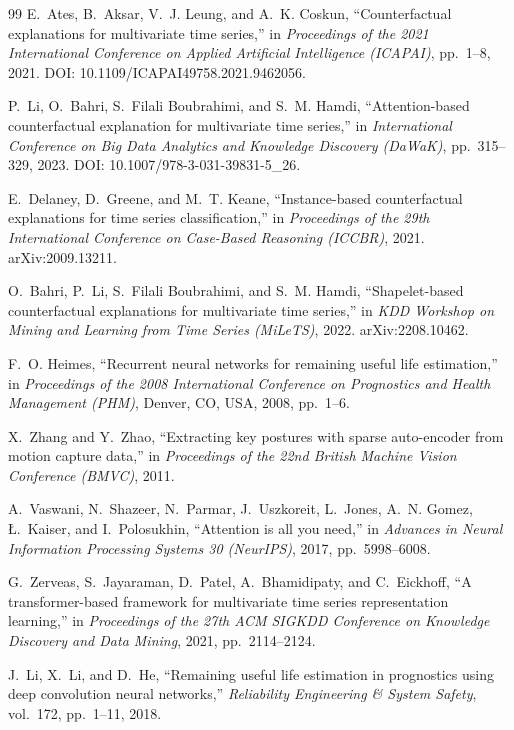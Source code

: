 \begin{thebibliography}{99}
E.~Ates, B.~Aksar, V.~J. Leung, and A.~K. Coskun,
``Counterfactual explanations for multivariate time series,''
in \textit{Proceedings of the 2021 International Conference on Applied Artificial Intelligence (ICAPAI)},
pp.~1--8, 2021.
DOI: 10.1109/ICAPAI49758.2021.9462056.

P.~Li, O.~Bahri, S.~Filali Boubrahimi, and S.~M. Hamdi,
``Attention-based counterfactual explanation for multivariate time series,''
in \textit{International Conference on Big Data Analytics and Knowledge Discovery (DaWaK)},
pp.~315--329, 2023.
DOI: 10.1007/978-3-031-39831-5\_26.

E.~Delaney, D.~Greene, and M.~T. Keane,
``Instance-based counterfactual explanations for time series classification,''
in \textit{Proceedings of the 29th International Conference on Case-Based Reasoning (ICCBR)},
2021. arXiv:2009.13211.

O.~Bahri, P.~Li, S.~Filali Boubrahimi, and S.~M. Hamdi,
``Shapelet-based counterfactual explanations for multivariate time series,''
in \textit{KDD Workshop on Mining and Learning from Time Series (MiLeTS)},
2022. arXiv:2208.10462.

F.~O. Heimes,
``Recurrent neural networks for remaining useful life estimation,''
in \textit{Proceedings of the 2008 International Conference on Prognostics and Health Management (PHM)},
Denver, CO, USA, 2008, pp.~1--6.

X.~Zhang and Y.~Zhao,
``Extracting key postures with sparse auto-encoder from motion capture data,''
in \textit{Proceedings of the 22nd British Machine Vision Conference (BMVC)}, 2011.

A.~Vaswani, N.~Shazeer, N.~Parmar, J.~Uszkoreit, L.~Jones, A.~N. Gomez, {\L}.~Kaiser, and I.~Polosukhin,
``Attention is all you need,''
in \textit{Advances in Neural Information Processing Systems 30 (NeurIPS)}, 2017, pp.~5998--6008.

G.~Zerveas, S.~Jayaraman, D.~Patel, A.~Bhamidipaty, and C.~Eickhoff,
``A transformer-based framework for multivariate time series representation learning,''
in \textit{Proceedings of the 27th ACM SIGKDD Conference on Knowledge Discovery and Data Mining},
2021, pp.~2114--2124.

J.~Li, X.~Li, and D.~He,
``Remaining useful life estimation in prognostics using deep convolution neural networks,''
\textit{Reliability Engineering \& System Safety}, vol.~172, pp.~1--11, 2018.


\end{thebibliography}
